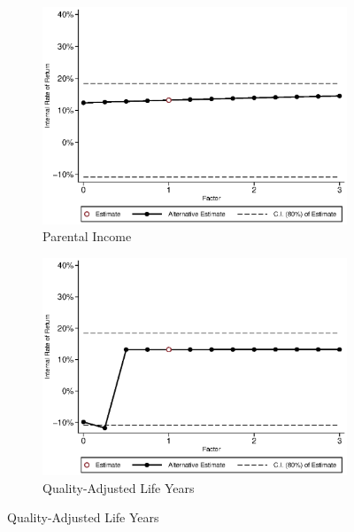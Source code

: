 \begin{figure}[H]
\ContinuedFloat		
	\begin{subfigure}[h]{0.8\textwidth}
	\centering
	\caption{Parental Income} \label{fig:irrf_inc_parent_m1}
	\includegraphics[width=\textwidth]{AppOutput/Sensitivity/irrf_inc_parent_m1.eps}
	\end{subfigure}
	
	\begin{subfigure}[h]{0.8\textwidth}
	\centering
	\caption{Quality-Adjusted Life Years} \label{fig:irrf_qaly_m1}
	\includegraphics[width=\textwidth]{AppOutput/Sensitivity/irrf_qaly_m1.eps}
	\end{subfigure}
\end{figure}
	
